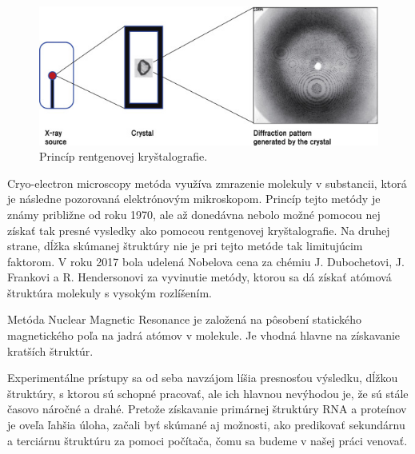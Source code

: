 \begin{figure}%
\includegraphics[width=\textwidth]{../img/x-ray}
\caption{Princíp rentgenovej kryštalografie. \cite{Ryu17}}
\label{obr03:x-ray}
\end{figure}


\indent Cryo-electron microscopy metóda využíva zmrazenie molekuly v substancii, ktorá je následne pozorovaná elektrónovým mikroskopom. Princíp tejto metódy je známy približne od roku 1970, ale až donedávna nebolo možné pomocou nej získať tak presné vysledky ako pomocou rentgenovej kryštalografie. Na druhej strane, dĺžka skúmanej štruktúry nie je pri tejto metóde tak limitujúcim faktorom. V roku 2017 bola udelená Nobelova cena za chémiu  J. Dubochetovi, J. Frankovi a  R. Hendersonovi za vyvinutie metódy, ktorou sa dá získať atómová štruktúra molekuly s vysokým rozlíšením.


\indent Metóda Nuclear Magnetic Resonance je založená na pôsobení statického magnetického poľa na jadrá atómov v molekule. Je vhodná hlavne na získavanie kratších štruktúr.


\indent Experimentálne prístupy sa od seba navzájom líšia presnosťou výsledku, dĺžkou štruktúry, s ktorou sú schopné pracovať, ale ich hlavnou nevýhodou je, že sú stále časovo náročné a drahé. Pretože získavanie primárnej štruktúry RNA a proteínov je oveľa ľahšia úloha, začali byť skúmané aj možnosti, ako predikovať sekundárnu a terciárnu štruktúru za pomoci počítača, čomu sa budeme v našej práci venovať.